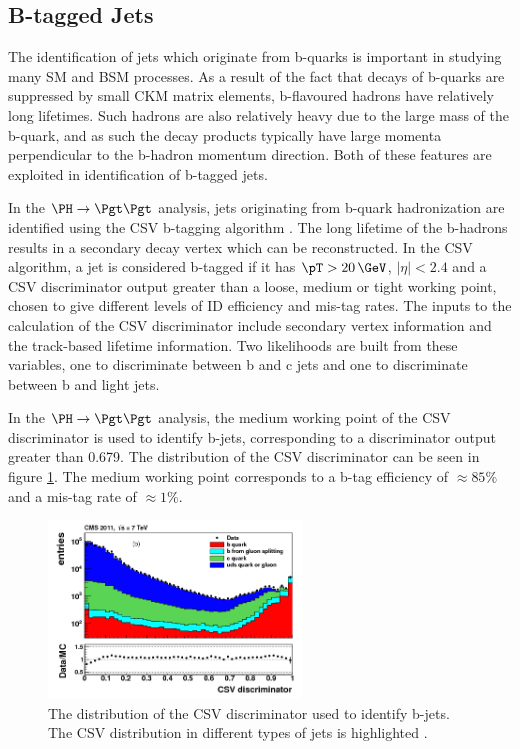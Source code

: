\subsection{B-tagged Jets}
\label{sec:btag}

The identification of jets which originate from b-quarks is important in
studying many
\ac{SM} and \ac{BSM} processes. As a result of the fact that decays of b-quarks
are suppressed by small CKM matrix elements, b-flavoured hadrons have relatively
long lifetimes. Such hadrons are also relatively heavy due to the large mass of
the b-quark, and as such the decay products typically have large momenta
perpendicular to the b-hadron momentum direction. Both of these features are
exploited in identification of b-tagged jets.

In the $\PH \to \Pgt\Pgt$ analysis, jets originating from b-quark
hadronization are identified using the \ac{CSV} b-tagging
algorithm \cite{bjets}. The long lifetime of the b-hadrons results in a
secondary decay vertex which can be reconstructed. In the \ac{CSV} algorithm, a
jet is considered b-tagged if it has $\pT>20\,\GeV$, $|\eta|<2.4$ and a
\ac{CSV} discriminator output greater than a loose, medium or tight working
point, chosen to give different levels of ID efficiency and mis-tag rates. The
inputs to the calculation of the \ac{CSV} discriminator include secondary
vertex information and the track-based lifetime information. Two likelihoods are
built from these variables, one to discriminate between b and c jets and one to
discriminate between b and light jets. 

In the $\PH\to\Pgt\Pgt$ analysis, the medium working point of the \ac{CSV}
discriminator is used to identify b-jets, corresponding to a discriminator
output greater than 0.679. The distribution of the \ac{CSV} discriminator 
can be seen in figure \ref{fig:csv}. The medium working point corresponds to a
b-tag efficiency of $\approx 85\%$ and a mis-tag rate of $\approx 1\%$. 

\begin{figure}
\begin{center}
    \includegraphics[width=0.6\textwidth]
      {plots/reco/csv.png}
\end{center}
\caption[The distribution of the CSV discriminator used to identify b-jets.]{
The distribution of the \ac{CSV} discriminator used to identify b-jets. The
\ac{CSV} distribution in different types of jets is highlighted \cite{bjets}.     
}
\label{fig:csv}
\end{figure}



